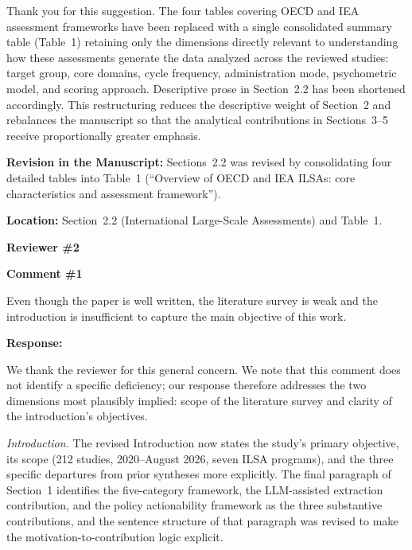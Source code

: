 \documentclass[12pt, a4paper]{article}
\begin{document}
Thank you for this suggestion. The four tables covering OECD and IEA assessment frameworks have
been replaced with a single consolidated summary table (Table~1) retaining only the dimensions
directly relevant to understanding how these assessments generate the data analyzed across the
reviewed studies: target group, core domains, cycle frequency, administration mode, psychometric
model, and scoring approach. Descriptive prose in Section~2.2 has been shortened accordingly.
This restructuring reduces the descriptive weight of Section~2 and rebalances the manuscript so
that the analytical contributions in Sections~3--5 receive proportionally greater emphasis.

\medskip
\noindent\textbf{Revision in the Manuscript:}
Sections~2.2 was revised by consolidating four detailed tables into Table~1 (``Overview of OECD
and IEA ILSAs: core characteristics and assessment framework'').

\medskip
\noindent\textbf{Location:} Section~2.2 (International Large-Scale Assessments) and Table~1.

\newpage


\noindent\textbf{\large Reviewer \#2}

\bigskip

\noindent\textbf{Comment \#1}

\medskip
\noindent\textcolor{reviewerblue}{%
Even though the paper is well written, the literature survey is weak and the introduction is
insufficient to capture the main objective of this work.}

\medskip
\noindent\textbf{Response:}

We thank the reviewer for this general concern. We note that this comment does not identify a
specific deficiency; our response therefore addresses the two dimensions most plausibly implied:
scope of the literature survey and clarity of the introduction's objectives.

\emph{Introduction.} The revised Introduction now states the study's primary objective, its scope
(212 studies, 2020--August 2026, seven ILSA programs), and the three specific departures from prior
syntheses more explicitly. The final paragraph of Section~1 identifies the five-category framework,
the LLM-assisted extraction contribution, and the policy actionability framework as the three
substantive contributions, and the sentence structure of that paragraph was revised to make the
motivation-to-contribution logic explicit.
\end{document}
